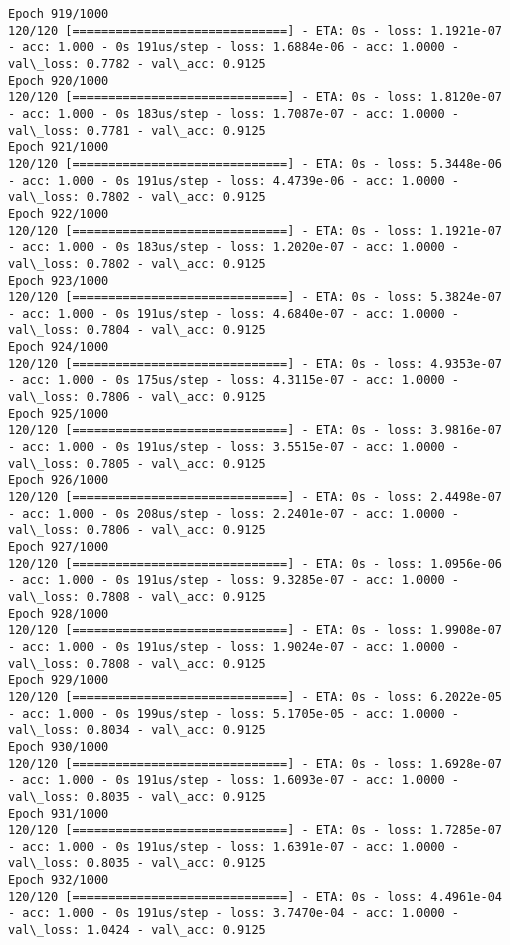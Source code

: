 \documentclass[11pt]{article}
\begin{document}
\begin{Verbatim}[commandchars=\\\{\}]
Epoch 919/1000
120/120 [==============================] - ETA: 0s - loss: 1.1921e-07 - acc: 1.000 - 0s 191us/step - loss: 1.6884e-06 - acc: 1.0000 - val\_loss: 0.7782 - val\_acc: 0.9125
Epoch 920/1000
120/120 [==============================] - ETA: 0s - loss: 1.8120e-07 - acc: 1.000 - 0s 183us/step - loss: 1.7087e-07 - acc: 1.0000 - val\_loss: 0.7781 - val\_acc: 0.9125
Epoch 921/1000
120/120 [==============================] - ETA: 0s - loss: 5.3448e-06 - acc: 1.000 - 0s 191us/step - loss: 4.4739e-06 - acc: 1.0000 - val\_loss: 0.7802 - val\_acc: 0.9125
Epoch 922/1000
120/120 [==============================] - ETA: 0s - loss: 1.1921e-07 - acc: 1.000 - 0s 183us/step - loss: 1.2020e-07 - acc: 1.0000 - val\_loss: 0.7802 - val\_acc: 0.9125
Epoch 923/1000
120/120 [==============================] - ETA: 0s - loss: 5.3824e-07 - acc: 1.000 - 0s 191us/step - loss: 4.6840e-07 - acc: 1.0000 - val\_loss: 0.7804 - val\_acc: 0.9125
Epoch 924/1000
120/120 [==============================] - ETA: 0s - loss: 4.9353e-07 - acc: 1.000 - 0s 175us/step - loss: 4.3115e-07 - acc: 1.0000 - val\_loss: 0.7806 - val\_acc: 0.9125
Epoch 925/1000
120/120 [==============================] - ETA: 0s - loss: 3.9816e-07 - acc: 1.000 - 0s 191us/step - loss: 3.5515e-07 - acc: 1.0000 - val\_loss: 0.7805 - val\_acc: 0.9125
Epoch 926/1000
120/120 [==============================] - ETA: 0s - loss: 2.4498e-07 - acc: 1.000 - 0s 208us/step - loss: 2.2401e-07 - acc: 1.0000 - val\_loss: 0.7806 - val\_acc: 0.9125
Epoch 927/1000
120/120 [==============================] - ETA: 0s - loss: 1.0956e-06 - acc: 1.000 - 0s 191us/step - loss: 9.3285e-07 - acc: 1.0000 - val\_loss: 0.7808 - val\_acc: 0.9125
Epoch 928/1000
120/120 [==============================] - ETA: 0s - loss: 1.9908e-07 - acc: 1.000 - 0s 191us/step - loss: 1.9024e-07 - acc: 1.0000 - val\_loss: 0.7808 - val\_acc: 0.9125
Epoch 929/1000
120/120 [==============================] - ETA: 0s - loss: 6.2022e-05 - acc: 1.000 - 0s 199us/step - loss: 5.1705e-05 - acc: 1.0000 - val\_loss: 0.8034 - val\_acc: 0.9125
Epoch 930/1000
120/120 [==============================] - ETA: 0s - loss: 1.6928e-07 - acc: 1.000 - 0s 191us/step - loss: 1.6093e-07 - acc: 1.0000 - val\_loss: 0.8035 - val\_acc: 0.9125
Epoch 931/1000
120/120 [==============================] - ETA: 0s - loss: 1.7285e-07 - acc: 1.000 - 0s 191us/step - loss: 1.6391e-07 - acc: 1.0000 - val\_loss: 0.8035 - val\_acc: 0.9125
Epoch 932/1000
120/120 [==============================] - ETA: 0s - loss: 4.4961e-04 - acc: 1.000 - 0s 191us/step - loss: 3.7470e-04 - acc: 1.0000 - val\_loss: 1.0424 - val\_acc: 0.9125

\end{Verbatim}
\end{document}
